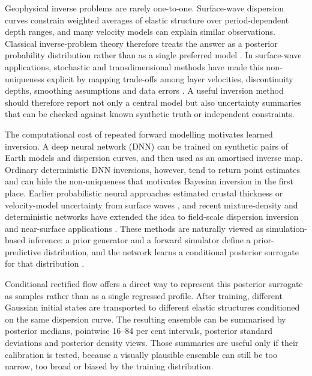 \documentclass[referee]{gji}
\begin{document}
Geophysical inverse problems are rarely one-to-one. Surface-wave dispersion curves constrain weighted averages of elastic structure over period-dependent depth ranges, and many velocity models can explain similar observations. Classical inverse-problem theory therefore treats the answer as a posterior probability distribution rather than as a single preferred model \citep{MosegaardTarantola1995,Tarantola2005}. In surface-wave applications, stochastic and transdimensional methods have made this non-uniqueness explicit by mapping trade-offs among layer velocities, discontinuity depths, smoothing assumptions and data errors \citep{Sambridge1999,ShapiroRitzwoller2002,BodinEtAl2012,GaoLekic2018}. A useful inversion method should therefore report not only a central model but also uncertainty summaries that can be checked against known synthetic truth or independent constraints.

The computational cost of repeated forward modelling motivates learned inversion. A deep neural network (DNN) can be trained on synthetic pairs of Earth models and dispersion curves, and then used as an amortised inverse map. Ordinary deterministic DNN inversions, however, tend to return point estimates and can hide the non-uniqueness that motivates Bayesian inversion in the first place. Earlier probabilistic neural approaches estimated crustal thickness or velocity-model uncertainty from surface waves \citep{DevileeEtAl1999,MeierEtAl2007}, and recent mixture-density and deterministic networks have extended the idea to field-scale dispersion inversion and near-surface applications \citep{EarpEtAl2020,KeilWassermann2023,ChenEtAl2022}. These methods are naturally viewed as simulation-based inference: a prior generator and a forward simulator define a prior-predictive distribution, and the network learns a conditional posterior surrogate for that distribution \citep{CranmerEtAl2020}.

Conditional rectified flow offers a direct way to represent this posterior surrogate as samples rather than as a single regressed profile. After training, different Gaussian initial states are transported to different elastic structures conditioned on the same dispersion curve. The resulting ensemble can be summarised by posterior medians, pointwise 16--84 per cent intervals, posterior standard deviations and posterior density views. Those summaries are useful only if their calibration is tested, because a visually plausible ensemble can still be too narrow, too broad or biased by the training distribution.
\end{document}
